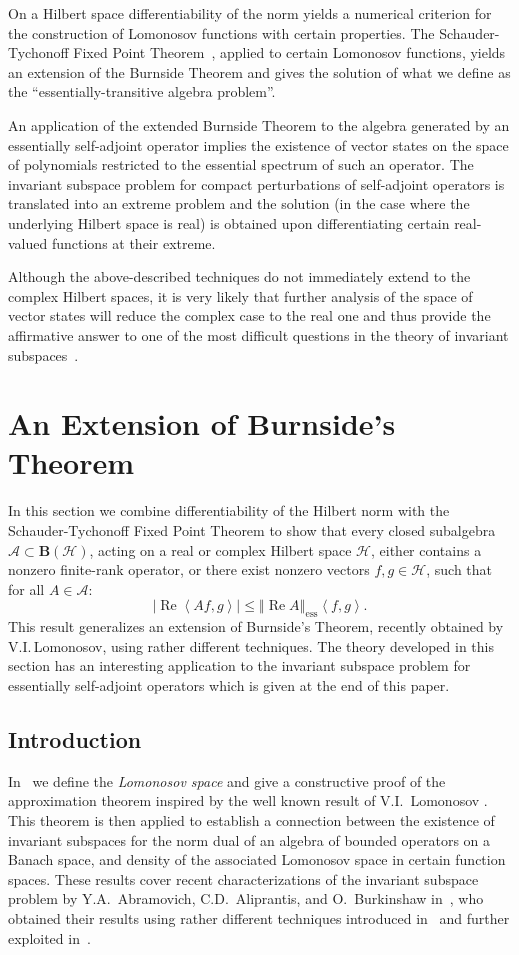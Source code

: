 \documentclass{tran-l}
\theoremstyle{definition}
\theoremstyle{remark}
\numberwithin{equation}{subsection}
\DeclareMathOperator{\RE}{Re}
\DeclareMathOperator{\ess}{ess}
\newcommand{\h}{\mathcal{H}}
\newcommand{\A}{\mathcal{A}}
\newcommand{\BH}{\mathbf{B}(\mathcal{H})}
\newcommand{\abs}[1]{\left\vert#1\right\vert}
\newcommand{\seq}[1]{\left<#1\right>}
\newcommand{\norm}[1]{\left\Vert#1\right\Vert}
\newcommand{\essnorm}[1]{\norm{#1}_{\ess}}
\begin{document}
On a Hilbert space differentiability of the norm yields a numerical criterion for the construction of Lomonosov functions with certain properties. The Schauder-Tychonoff Fixed Point Theorem~\cite[p.~456]{DS57}, applied to certain Lomonosov functions, yields an extension of the Burnside Theorem and gives the solution of what we define as the ``essentially-transitive algebra problem''.

An application of the extended Burnside Theorem to the algebra generated by an essentially self-adjoint operator implies the existence of vector states on the space of polynomials restricted to the essential spectrum of such an operator. The invariant subspace problem for compact perturbations of self-adjoint operators is translated into an extreme problem and the solution (in the case where the underlying Hilbert space is real) is obtained upon differentiating certain real-valued functions at their extreme.

Although the above-described techniques do not immediately extend to the complex Hilbert spaces, it is very likely that further analysis of the space of vector states will reduce the complex case to the real one and thus provide the affirmative answer to one of the most difficult questions in the theory of invariant subspaces~\cite{Lom92}.

\section{An Extension of Burnside's Theorem}

In this section we combine differentiability of the Hilbert norm with the Schauder-Tychonoff Fixed Point Theorem to show that every closed subalgebra $\A\subset\BH$, acting on a real or complex Hilbert space $\h$, either contains a nonzero finite-rank operator, or there exist nonzero vectors $f,g\in\h$, such that for all $A\in\A$:
\[ \abs{\RE\seq{A f,g}}\leq\essnorm{\RE A}\seq{f,g}. \]
This result generalizes an extension of Burnside's Theorem, recently obtained by V.I.\,Lomonosov, using rather different techniques. The theory developed in this section has an interesting application to the invariant subspace problem for essentially self-adjoint operators which is given at the end of this paper.

\subsection{Introduction}
In~\cite{Sim96a} we define the \emph{Lomonosov space} and give a constructive proof of the approximation theorem inspired by the well known result of V.I.~Lo\-mo\-no\-sov \cite{Lom73}. This theorem is then applied to establish a connection between the existence of invariant subspaces for the norm dual of an algebra of bounded operators on a Banach space, and density of the associated Lomonosov space in certain function spaces. These results cover recent characterizations of the invariant subspace problem by Y.A.~Abramovich, C.D.~Aliprantis, and O.~Burkinshaw in~\cite{AAB95}, who obtained their results using rather different techniques introduced in~\cite{Lom91} and further exploited in~\cite{dB93}.
\end{document}
